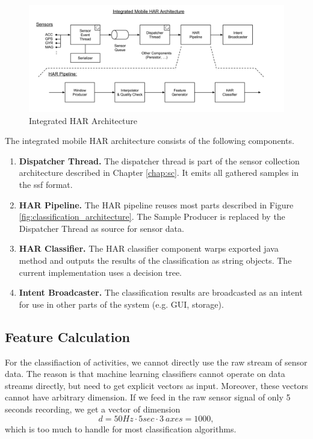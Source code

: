 \begin{figure}[htbp]
\centering
\includegraphics[width=\textwidth]{img/har/integration.png}
\caption{Integrated HAR Architecture}\label{fig:integrated_har}
\end{figure}

The integrated mobile HAR architecture consists of the following components.
\begin{enumerate}
\item {\bf Dispatcher Thread.} The dispatcher thread is part of
  the sensor collection architecture described in Chapter
  \ref{chap:sc}. It emits all gathered samples in the ssf format.
\item {\bf HAR Pipeline.} The HAR pipeline reuses most parts described
  in Figure \ref{fig:classification_architecture}. The Sample Producer
  is replaced by the Dispatcher Thread as source for sensor data.
\item {\bf HAR Classifier.} The HAR classifier component warps
  exported java method and outputs the results of the classification
  as string objects. The current implementation uses a decision tree.
\item {\bf Intent Broadcaster.} The classification results are
  broadcasted as an intent for use in other parts of the system
  (e.g. GUI, storage).
\end{enumerate}

\subsection{Feature Calculation}
\label{sec:feature_calc}

For the classifiaction of activities, we cannot directly use the raw
stream of sensor data. The reason is that machine learning classifiers
cannot operate on data streams directly, but need to get explicit
vectors as input. Moreover, these vectors cannot have arbitrary
dimension. If we feed in the raw sensor signal of only 5 seconds
recording, we get a vector of dimension
\[ d = 50 Hz \cdot 5 sec \cdot 3\ axes = 1000, \]
which is too much to handle for most classification algorithms.

